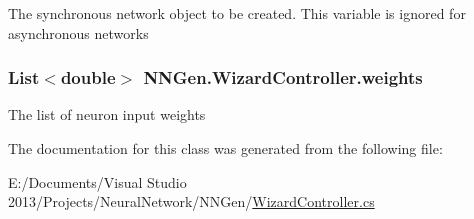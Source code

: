 The synchronous network object to be created. This variable is ignored for asynchronous networks 

\hypertarget{class_n_n_gen_1_1_wizard_controller_a6978f46ec504d8be14ec6517959d131a}{}
\subsubsection[{weights}]{\setlength{\rightskip}{0pt plus 5cm}List$<$double$>$ N\+N\+Gen.\+Wizard\+Controller.\+weights\hspace{0.3cm}{\ttfamily [get]}}\label{class_n_n_gen_1_1_wizard_controller_a6978f46ec504d8be14ec6517959d131a}


The list of neuron input weights 



The documentation for this class was generated from the following file\+:\begin{DoxyCompactItemize}
\item 
E\+:/\+Documents/\+Visual Studio 2013/\+Projects/\+Neural\+Network/\+N\+N\+Gen/\hyperlink{_wizard_controller_8cs}{Wizard\+Controller.\+cs}\end{DoxyCompactItemize}
